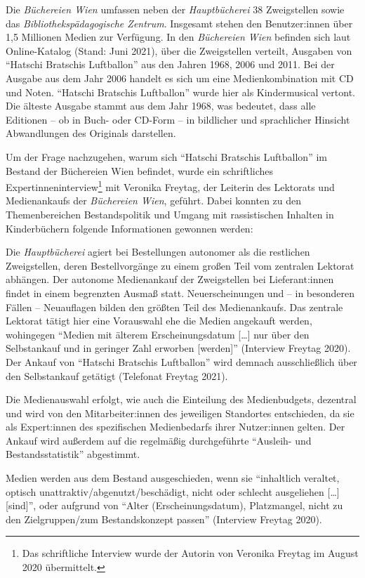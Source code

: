 \documentclass[a4paper,
fontsize=11pt,
oneside,
numbers=noperiodatend,
parskip=half-,
bibliography=totoc,
final
]{scrartcl}
\begin{document}
Die \emph{Büchereien Wien} umfassen neben der \emph{Hauptbücherei} 38
Zweigstellen sowie das \emph{Bibliothekspädagogische Zentrum}. Insgesamt
stehen den Benutzer:innen über 1,5 Millionen Medien zur Verfügung. In
den \emph{Büchereien Wien} befinden sich laut Online-Katalog (Stand:
Juni 2021), über die Zweigstellen verteilt, Ausgaben von \enquote{Hatschi
Bratschis Luftballon} aus den Jahren 1968, 2006 und 2011. Bei der
Ausgabe aus dem Jahr 2006 handelt es sich um eine Medienkombination mit
CD und Noten. \enquote{Hatschi Bratschis Luftballon} wurde hier als
Kindermusical vertont. Die älteste Ausgabe stammt aus dem Jahr 1968, was
bedeutet, dass alle Editionen -- ob in Buch- oder CD-Form -- in
bildlicher und sprachlicher Hinsicht Abwandlungen des Originals
darstellen.

Um der Frage nachzugehen, warum sich \enquote{Hatschi Bratschis Luftballon} im
Bestand der Büchereien Wien befindet, wurde ein schriftliches
Expertinneninterview\footnote{Das schriftliche Interview wurde der
  Autorin von Veronika Freytag im August 2020 übermittelt.} mit Veronika
Freytag, der Leiterin des Lektorats und Medienankaufs der
\emph{Büchereien Wien}, geführt. Dabei konnten zu den Themenbereichen
Bestandspolitik und Umgang mit rassistischen Inhalten in Kinderbüchern
folgende Informationen gewonnen werden:

Die \emph{Hauptbücherei} agiert bei Bestellungen autonomer als die
restlichen Zweigstellen, deren Bestellvorgänge zu einem großen Teil vom
zentralen Lektorat abhängen. Der autonome Medienankauf der Zweigstellen
bei Lieferant:innen findet in einem begrenzten Ausmaß statt.
Neuerscheinungen und -- in besonderen Fällen -- Neuauflagen bilden den
größten Teil des Medienankaufs. Das zentrale Lektorat tätigt hier eine
Vorauswahl ehe die Medien angekauft werden, wohingegen \enquote{Medien mit
älterem Erscheinungsdatum [\ldots] nur über den Selbstankauf und in
geringer Zahl erworben [werden]} (Interview Freytag 2020). Der
Ankauf von \enquote{Hatschi Bratschis Luftballon} wird demnach ausschließlich
über den Selbstankauf getätigt (Telefonat Freytag 2021).

Die Medienauswahl erfolgt, wie auch die Einteilung des Medienbudgets,
dezentral und wird von den Mitarbeiter:innen des jeweiligen Standortes
entschieden, da sie als Expert:innen des spezifischen Medienbedarfs
ihrer Nutzer:innen gelten. Der Ankauf wird außerdem auf die regelmäßig
durchgeführte \enquote{Ausleih- und Bestandsstatistik} abgestimmt.

Medien werden aus dem Bestand ausgeschieden, wenn sie \enquote{inhaltlich
veraltet, optisch unattraktiv/abgenutzt/beschädigt, nicht oder schlecht
ausgeliehen [\ldots] [sind]}, oder aufgrund von \enquote{Alter
(Erscheinungsdatum), Platzmangel, nicht zu den Zielgruppen/zum
Bestandskonzept passen} (Interview Freytag 2020).
\end{document}
